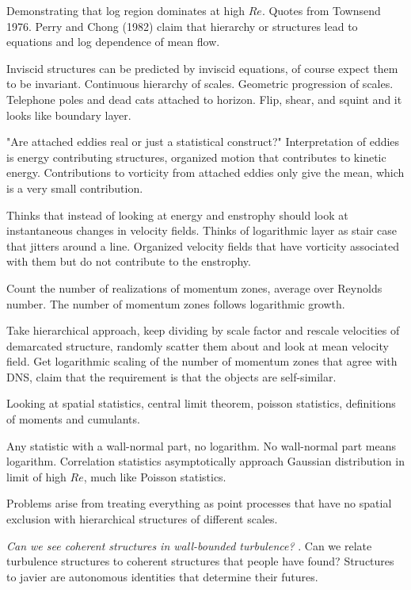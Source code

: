 \begin{description}
{\begin{description}
Demonstrating that log region dominates at high $Re$.
Quotes from Townsend 1976. Perry and Chong (1982) claim that hierarchy or structures
lead to equations and log dependence of mean flow.

Inviscid structures can be predicted by inviscid equations, of course expect them to be invariant.
Continuous hierarchy of scales.
Geometric progression of scales. Telephone poles and dead cats attached to horizon.
Flip, shear, and squint and it looks like boundary layer.

"Are attached eddies real or just a statistical construct?"
Interpretation of eddies is energy contributing structures, organized
motion that contributes to kinetic energy. Contributions
to vorticity from attached eddies only give the mean, which is a very small
contribution.

Thinks that instead of looking at energy and enstrophy should look at instantaneous
changes in velocity fields. Thinks of logarithmic layer as stair case that jitters around
a line. Organized velocity fields that have vorticity associated with them but do not
contribute to the enstrophy.

Count the number of realizations of momentum zones, average over Reynolds number. The number
of momentum zones follows logarithmic growth.

Take hierarchical approach, keep dividing by scale factor and rescale velocities of demarcated
structure, randomly scatter them about and look at mean velocity field. Get logarithmic
scaling of the number of momentum zones that agree with DNS, claim that the requirement
is that the objects are self-similar.

Looking at spatial statistics, central limit theorem, poisson statistics, definitions of
moments and cumulants.

Any statistic with a wall-normal part, no logarithm. No wall-normal part means logarithm.
Correlation statistics asymptotically approach Gaussian distribution in limit of high $Re$,
much like Poisson statistics.

Problems arise from treating everything as point processes that have no spatial exclusion
with hierarchical structures of different scales.

\item[J. Jimenez]
\textit{Can we see coherent structures in wall-bounded turbulence?}
.
Can we relate turbulence structures to coherent structures that people have found?
Structures to javier are autonomous identities that determine their futures.


\end{description}}
\end{description}
